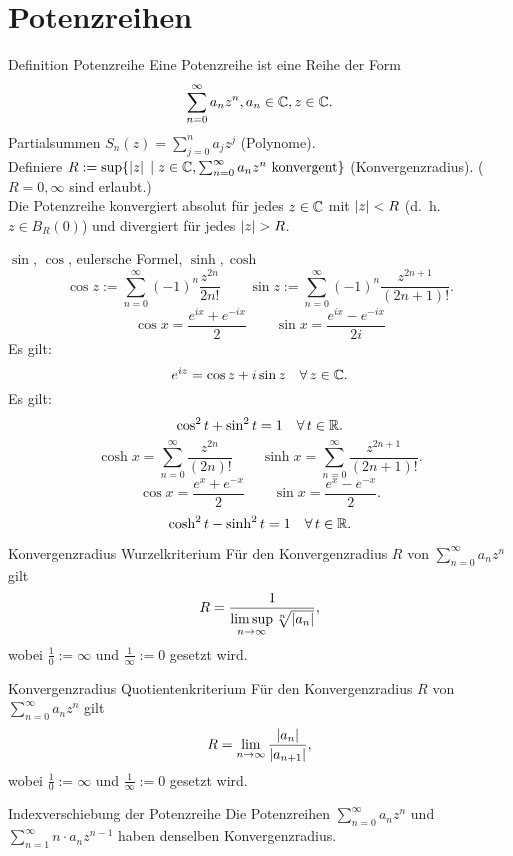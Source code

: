 \documentclass[main.tex]{subfiles}
\begin{document}
\section*{Potenzreihen}

\begin{karte}{Definition Potenzreihe}
    Eine Potenzreihe ist eine Reihe der Form
    \[ \sum_{n=0}^\infty a_n z^n, a_n \in\mathbb{C}, z \in\mathbb{C}. \]
    Partialsummen \( S_n(z) = \sum_{j=0}^n a_j z^j \) (Polynome).\\
    Definiere \( R:= \sup \{ \left| z \right| \;\vert \; z\in\mathbb{C}, 
    \sum_{n=0}^\infty a_n z^n \text{ konvergent} \} \)
    (Konvergenzradius). (\( R = 0, \infty \) sind erlaubt.)\\
    Die Potenzreihe konvergiert absolut für jedes \( z\in\mathbb{C} \) 
    mit \( \left| z \right| < R \) (d.\ h.\  \( z\in B_R(0) \)) 
    und divergiert für jedes \( \left| z \right| > R \).
\end{karte}
\begin{karte}{\( \sin \), \( \cos \), eulersche Formel, \( \sinh, \cosh \)}
    \[ \cos z := \sum_{n=0}^\infty {(-1)}^n \frac{z^{2n}}{2n!}
    \qquad \sin z  := \sum_{n=0}^\infty {(-1)}^n 
    \frac{z^{2n+1}}{(2n+1)!}. \]
    \[ \cos x = \frac{e^{ix} + e^{-ix}}{2} \qquad 
    \sin x = \frac{e^{ix} - e^{-ix}}{2i} \]
    Es gilt:
    \[ e^{iz} = \cos z + i \sin z \quad \forall z\in\C. \]
    Es gilt:
    \[ \cos^2 t + \sin^2 t = 1 \quad \forall t \in \R. \]
    \[ \cosh x = \sum_{n=0}^\infty \frac{z^{2n}}{(2n)!} \qquad 
    \sinh x = \sum_{n=0}^\infty \frac{z^{2n + 1}}{(2n + 1)!}. \]
    \[ \cos x = \frac{e^{x} + e^{-x}}{2} \qquad 
    \sin x = \frac{e^{x} - e^{-x}}{2}. \]
    \[ \cosh^2 t - \sinh^2 t = 1 \quad \forall t \in \R. \]
\end{karte}
\begin{karte}{Konvergenzradius Wurzelkriterium}
    Für den Konvergenzradius \( R \) von 
    \( \sum_{n=0}^\infty a_n z^n \) gilt
    \[ R = \frac{1}{\limsup\limits_{n\rightarrow\infty} \sqrt[n]{\left| a_n \right|}}, \]
    wobei \(\frac{1}{0} := \infty \) und 
    \( \frac{1}{\infty} := 0 \) gesetzt wird.
\end{karte}
\begin{karte}{Konvergenzradius Quotientenkriterium}
    Für den Konvergenzradius \( R \) von 
    \( \sum_{n=0}^\infty a_n z^n \) gilt
    \[ R = \lim\limits_{n\rightarrow\infty} \frac{\left|  a_n  \right|}{\left|  a_{n+1}  \right|}, \]
    wobei \(\frac{1}{0} := \infty \) und 
    \( \frac{1}{\infty} := 0 \) gesetzt wird.
\end{karte}
\begin{karte}{Indexverschiebung der Potenzreihe}
    Die Potenzreihen \( \sum_{n=0}^\infty a_n z^n \) 
    und \( \sum_{n=1}^\infty n \cdot a_n z^{n-1} \) 
    haben denselben Konvergenzradius.
\end{karte}
\end{document}
